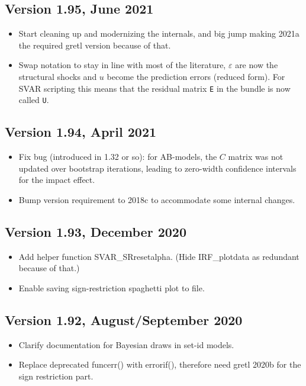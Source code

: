 \documentclass[a4paper,10pt]{article}
\newcounter{script}[section]
\begin{document}
\subsection*{Version 1.95, June 2021}
\begin{itemize}
\item Start cleaning up and modernizing the internals, and big jump
  making 2021a the required gretl version because of that.
\item Swap notation to stay in line with most of the literature, $\varepsilon$ are now the structural shocks and $u$ become the prediction errors (reduced form). For SVAR scripting
this means that the residual matrix \texttt{E} in the bundle is now called \texttt{U}.  
\end{itemize}

\subsection*{Version 1.94, April 2021}
\begin{itemize}
\item Fix bug (introduced in 1.32 or so): for AB-models, the $C$ matrix was
  not updated over bootstrap iterations, leading to zero-width confidence 
  intervals for the impact effect.
\item Bump version requirement to 2018c to accommodate some internal changes.
\end{itemize}

\subsection*{Version 1.93, December 2020}
\begin{itemize}
\item Add helper function SVAR\_SRresetalpha. (Hide IRF\_plotdata as 
 redundant because of that.)
 \item Enable saving sign-restriction spaghetti plot to file.
\end{itemize}

\subsection*{Version 1.92, August/September 2020}
\begin{itemize}
\item Clarify documentation for Bayesian draws in set-id models.
\item Replace deprecated funcerr() with errorif(), therefore need gretl 2020b
  for the sign restriction part. 
\end{itemize}
\end{document}
